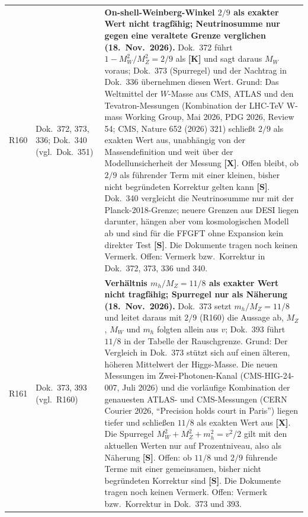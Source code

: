 \begin{longtable}{@{}p{0.9cm}p{3.1cm}p{10.2cm}@{}}
R160 & Dok.~372, 373, 336; Dok.~340 (vgl.\ Dok.~351) & \textbf{On-shell-Weinberg-Winkel $2/9$ als exakter Wert nicht tragfähig; Neutrinosumme nur gegen eine veraltete Grenze verglichen (18.~Nov.~2026).} Dok.~372 führt $1-M_W^2/M_Z^2=2/9$ als \textbf{[K]} und sagt daraus $M_W$ voraus; Dok.~373 (Spurregel) und der Nachtrag in Dok.~336 übernehmen diesen Wert. Grund: Das Weltmittel der $W$-Masse aus CMS, ATLAS und den Tevatron-Messungen (Kombination der LHC-TeV W-mass Working Group, Mai 2026, PDG 2026, Review 54; CMS, Nature 652 (2026) 321) schließt $2/9$ als exakten Wert aus, unabhängig von der Massendefinition und weit über der Modellunsicherheit der Messung \textbf{[X]}. Offen bleibt, ob $2/9$ als führender Term mit einer kleinen, bisher nicht begründeten Korrektur gelten kann \textbf{[S]}. Dok.~340 vergleicht die Neutrinosumme nur mit der Planck-2018-Grenze; neuere Grenzen aus DESI liegen darunter, hängen aber vom kosmologischen Modell ab und sind für die FFGFT ohne Expansion kein direkter Test \textbf{[S]}. Die Dokumente tragen noch keinen Vermerk. Offen: Vermerk bzw.\ Korrektur in Dok.~372, 373, 336 und 340. \\
R161 & Dok.~373, 393 (vgl.\ R160) & \textbf{Verhältnis $m_h/M_Z=11/8$ als exakter Wert nicht tragfähig; Spurregel nur als Näherung (18.~Nov.~2026).} Dok.~373 setzt $m_h/M_Z=11/8$ und leitet daraus mit $2/9$ (R160) die Aussage ab, $M_Z$, $M_W$ und $m_h$ folgten allein aus $v$; Dok.~393 führt $11/8$ in der Tabelle der Rauschgrenze. Grund: Der Vergleich in Dok.~373 stützt sich auf einen älteren, höheren Mittelwert der Higgs-Masse. Die neuen Messungen im Zwei-Photonen-Kanal (CMS-HIG-24-007, Juli 2026) und die vorläufige Kombination der genauesten ATLAS- und CMS-Messungen (CERN Courier 2026, \enquote{Precision holds court in Paris}) liegen tiefer und schließen $11/8$ als exakten Wert aus \textbf{[X]}. Die Spurregel $M_W^2+M_Z^2+m_h^2=v^2/2$ gilt mit den aktuellen Werten nur auf Prozentniveau, also als Näherung \textbf{[S]}. Offen: ob $11/8$ und $2/9$ führende Terme mit einer gemeinsamen, bisher nicht begründeten Korrektur sind \textbf{[S]}. Die Dokumente tragen noch keinen Vermerk. Offen: Vermerk bzw.\ Korrektur in Dok.~373 und 393. \\

\end{longtable}

